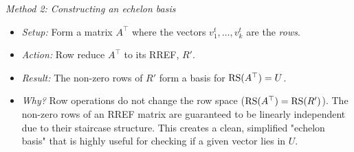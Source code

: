 \documentclass[../linear_algebra_and_groups.tex]{subfiles}
\begin{document}
\textit{Method 2: Constructing an echelon basis}
\begin{itemize}
    \item \textit{Setup:} Form a matrix $A^\top$ where the vectors $v_1^t, \dots, v_k^t$ are the \textit{rows}.
    \item \textit{Action:} Row reduce $A^\top$ to its RREF, $R'$.
    \item \textit{Result:} The non-zero rows of $R'$ form a basis for $\operatorname{RS}(A^\top) = U$. 
    \item \textit{Why?} Row operations do not change the row space ($\operatorname{RS}(A^\top) = \operatorname{RS}(R')$). The non-zero rows of an RREF matrix are guaranteed to be linearly independent due to their staircase structure. This creates a clean, simplified "echelon basis" that is highly useful for checking if a given vector lies in $U$.
\end{itemize}
\end{document}
